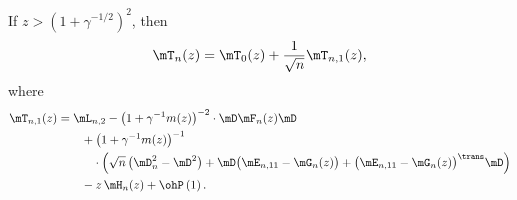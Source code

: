 \begin{lemma}
    If $z > (1 + \gamma^{-1/2})^2$, then
    \[
        \mT_n( z ) 
            = 
                \mT_0( z )
                +
                \frac{1}{\sqrt{n}}
                \mT_{n,1}( z ),
    \]
    where
    \begin{equation*}
        \begin{split}
            \mT_{n,1}( z ) 
                &= \mL_{n,2}
                -
                \big( 1 + \gamma^{-1} m(z) \big)^{-2}
                    \cdot
                    \mD \mF_n(z) \mD \\
                &\quad\quad+ 
                \big( 1 + \gamma^{-1} m(z) \big)^{-1} \\
                    &\quad\quad\quad\cdot
                    \Big(
                        \sqrt{n} \left( \mD_n^2 - \mD^2 \right)
                        +
                        \mD \big( \mE_{n,11} - \mG_n(z) \big)
                        + 
                        \big( \mE_{n,11} - \mG_n(z) \big)^\trans \mD
                    \Big)  \\
                &\quad\quad-
                z \, \mH_n(z)
                +
                \ohP\left( 1 \right).
        \end{split}
    \end{equation*}
\end{lemma}
